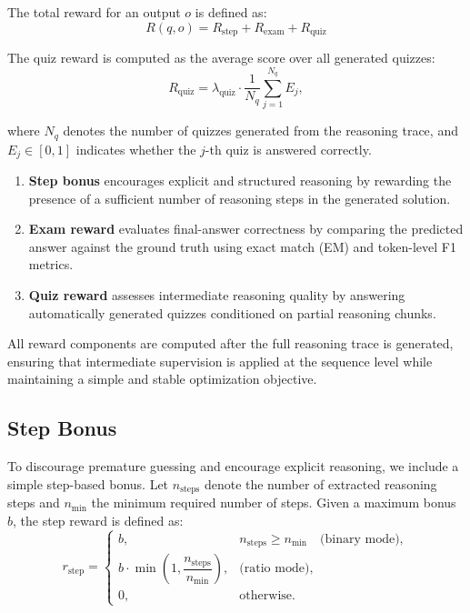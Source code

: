 \documentclass[12pt]{report}
\begin{document}
The total reward for an output $o$ is defined as:
\begin{equation}
R(q,o) = R_{\text{step}} + R_{\text{exam}} + R_{\text{quiz}}
\end{equation}

The quiz reward is computed as the average score over all generated quizzes:
\begin{equation}
R_{\text{quiz}} = \lambda_{\text{quiz}} \cdot \frac{1}{N_q}
\sum_{j=1}^{N_q} E_j ,
\end{equation}

where $N_q$ denotes the number of quizzes generated from the reasoning trace, and $E_j \in [0,1]$
indicates whether the $j$-th quiz is answered correctly.


\begin{enumerate}
    \item \textbf{Step bonus} encourages explicit and structured reasoning by rewarding the
    presence of a sufficient number of reasoning steps in the generated solution.

    \item \textbf{Exam reward} evaluates final-answer correctness by comparing the predicted
    answer against the ground truth using exact match (EM) and token-level F1 metrics.

    \item \textbf{Quiz reward} assesses intermediate reasoning quality by answering automatically
    generated quizzes conditioned on partial reasoning chunks.
\end{enumerate}

All reward components are computed after the full reasoning trace is generated, ensuring that
intermediate supervision is applied at the sequence level while maintaining a simple and stable
optimization objective.


\subsection{Step Bonus}
To discourage premature guessing and encourage explicit reasoning, we include a simple step-based bonus. Let $n_{\text{steps}}$ denote the number of extracted reasoning steps and $n_{\min}$ the minimum required number of steps. Given a maximum bonus $b$, the step reward is defined as:
\begin{equation}
r_{\text{step}} =
\begin{cases}
b, 
& n_{\text{steps}} \ge n_{\min} 
\quad \text{(binary mode)}, \\[6pt]

b \cdot \min\!\left(1, \dfrac{n_{\text{steps}}}{n_{\min}}\right), 
& \text{(ratio mode)}, \\[6pt]

0, 
& \text{otherwise}.
\end{cases}
\end{equation}
\end{document}
